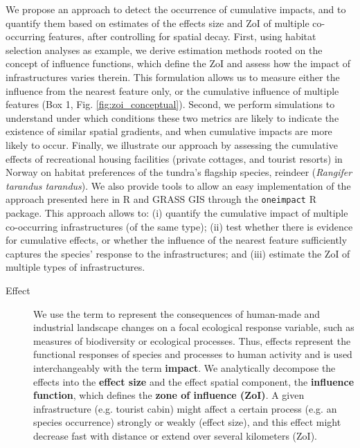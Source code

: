 \documentclass[titlepage]{article}
\begin{document}
{We propose an approach to detect the occurrence of cumulative impacts, and to quantify them based on estimates of the effects size and ZoI of multiple co-occurring features, after controlling for spatial decay. First, using habitat selection analyses as example, we derive estimation methods rooted on the concept of influence functions, which define the ZoI and assess how the impact of infrastructures varies therein. This formulation allows us to measure either the influence from the nearest feature only, or the cumulative influence of multiple features (Box 1, Fig. \ref{fig:zoi_conceptual}). Second, we perform simulations to understand under which conditions these two metrics are likely to indicate the existence of similar spatial gradients, and when cumulative impacts are more likely to occur. Finally, we illustrate our approach by assessing the cumulative effects of recreational housing facilities (private cottages, and tourist resorts) in Norway on habitat preferences of the tundra's flagship species, reindeer (\textit{Rangifer tarandus tarandus}). We also provide tools to allow an easy implementation of the approach presented here in R \citep{r_core_team_r_2020} and GRASS GIS \citep{grass_development_team_geographic_2017} through the \verb|oneimpact| R package. This approach allows to: (i) quantify the cumulative impact of multiple co-occurring infrastructures (of the same type); (ii) test whether there is evidence for cumulative effects, or whether the influence of the nearest feature sufficiently captures the species' response to the infrastructures; and (iii) estimate the ZoI of multiple types of infrastructures. 

\begin{tcolorbox}[width=1.3\textwidth,center,colback=yellow!5,colframe=yellow!75!black,title={Box 1 -- Definitions}]

\begin{description}

    \item[Effect] We use the term to represent the consequences of human-made and industrial landscape changes on a focal ecological response variable, such as measures of biodiversity or ecological processes. Thus, effects represent the functional responses of species and processes to human activity and is used interchangeably with the term \textbf{impact}. We analytically decompose the effects into the \textbf{effect size} and the effect spatial component, the \textbf{influence function}, which defines the \textbf{zone of influence (ZoI)}. A given infrastructure (e.g. tourist cabin) might affect a certain process (e.g. an species occurrence) strongly or weakly (effect size), and this effect might decrease fast with distance or extend over several kilometers (ZoI).
    

\end{description}
\end{tcolorbox}}
\end{document}
